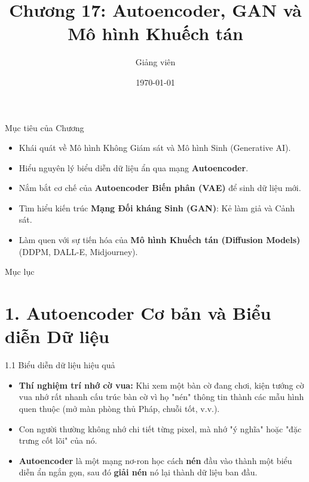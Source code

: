 \documentclass[aspectratio=169, 12pt]{beamer}
\title[ML - Chap 17]{Chương 17: Autoencoder, GAN và Mô hình Khuếch tán}
\author[Giảng viên]{Giảng viên}
\institute[Đại học Đông Á]{Đại học Đông Á}
\date{\today}
\begin{document}
\begin{frame}
    \titlepage
\end{frame}

\begin{frame}{Mục tiêu của Chương}
    \begin{itemize}
        \item Khái quát về Mô hình Không Giám sát và Mô hình Sinh (Generative AI).
        \item Hiểu nguyên lý biểu diễn dữ liệu ẩn qua mạng \textbf{Autoencoder}.
        \item Nắm bắt cơ chế của \textbf{Autoencoder Biến phân (VAE)} để sinh dữ liệu mới.
        \item Tìm hiểu kiến trúc \textbf{Mạng Đối kháng Sinh (GAN)}: Kẻ làm giả và Cảnh sát.
        \item Làm quen với sự tiến hóa của \textbf{Mô hình Khuếch tán (Diffusion Models)} (DDPM, DALL-E, Midjourney).
    \end{itemize}
\end{frame}

\begin{frame}{Mục lục}
    \tableofcontents
\end{frame}

\section{1. Autoencoder Cơ bản và Biểu diễn Dữ liệu}

\begin{frame}{1.1 Biểu diễn dữ liệu hiệu quả}
    \begin{itemize}
        \item \textbf{Thí nghiệm trí nhớ cờ vua:} Khi xem một bàn cờ đang chơi, kiện tướng cờ vua nhớ rất nhanh cấu trúc bàn cờ vì họ "nén" thông tin thành các mẫu hình quen thuộc (mở màn phòng thủ Pháp, chuỗi tốt, v.v.).
        \item Con người thường không nhớ chi tiết từng pixel, mà nhớ "ý nghĩa" hoặc "đặc trưng cốt lõi" của nó.
        \item \textbf{Autoencoder} là một mạng nơ-ron học cách \textbf{nén} đầu vào thành một biểu diễn ẩn ngắn gọn, sau đó \textbf{giải nén} nó lại thành dữ liệu ban đầu.
    \end{itemize}
\end{frame}
\end{document}
